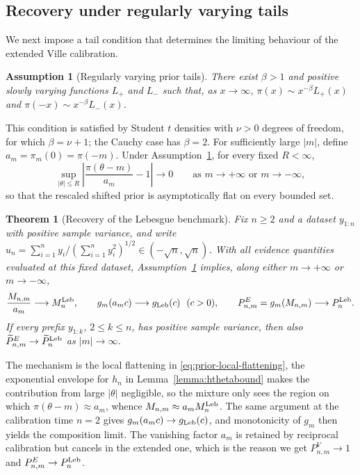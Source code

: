 \documentclass{article}
\newtheorem{theorem}{Theorem}
\newtheorem{assumption}{Assumption}
\begin{document}
\subsection{Recovery under regularly varying tails}
\label{subsec:recovery}

We next impose a tail condition that determines the limiting behaviour of
the extended Ville calibration.

\begin{assumption}[Regularly varying prior tails]
\label{ass:tails}
There exist $\beta>1$ and positive slowly varying functions $L_+$ and
$L_-$ such that, as $x\to\infty$, $\pi(x)\sim x^{-\beta}L_+(x)$ and
$\pi(-x)\sim x^{-\beta}L_-(x)$.
\end{assumption}

This condition is satisfied by Student $t$ densities with $\nu>0$ degrees
of freedom, for which $\beta=\nu+1$; the Cauchy case has $\beta=2$. For
sufficiently large $|m|$, define $a_m=\pi_m(0)=\pi(-m)$. Under
Assumption~\ref{ass:tails}, for every fixed $R<\infty$,
\begin{equation}
\label{eq:prior-local-flattening}
  \sup_{|\theta|\leq R}
  \left|\frac{\pi(\theta-m)}{a_m}-1\right|\longrightarrow0
  \qquad\text{as }m\to+\infty\text{ or }m\to-\infty,
\end{equation}
so that the rescaled shifted prior is asymptotically flat on every
bounded set.

\begin{theorem}[Recovery of the Lebesgue benchmark]
\label{thm:recovery}
Fix $n\geq2$ and a dataset $y_{1:n}$ with positive sample variance, and
write
$u_n=\sum_{i=1}^ny_i/(\sum_{i=1}^ny_i^2)^{1/2}\in(-\sqrt n,\sqrt n)$.
With all evidence quantities evaluated at this fixed dataset,
Assumption~\ref{ass:tails} implies, along either $m\to+\infty$ or
$m\to-\infty$,
\begin{equation}
\label{eq:recovery-limits}
  \frac{M_{n,m}}{a_m}\longrightarrow M_n^{\mathrm{Leb}},
  \qquad
  g_m(a_mc)\longrightarrow g_{\mathrm{Leb}}(c)\ \ (c>0),
  \qquad
  P_{n,m}^E=g_m(M_{n,m})\longrightarrow P_n^{\mathrm{Leb}} .
\end{equation}
If every prefix $y_{1:k}$, $2\leq k\leq n$, has positive sample variance,
then also $\widetilde P_{n,m}^E\to\widetilde P_n^{\mathrm{Leb}}$ as
$|m|\to\infty$.
\end{theorem}

The mechanism is the local flattening in
\eqref{eq:prior-local-flattening}, the exponential envelope for $h_n$ in Lemma~\ref{lemma:hthetabound} makes the contribution from large $|\theta|$ negligible, so the mixture only sees the region on which
$\pi(\theta-m)\approx a_m$, whence $M_{n,m}\approx a_mM_n^{\mathrm{Leb}}$. The same argument at the calibration time $n=2$ gives $g_m(a_mc)\to g_{\mathrm{Leb}}(c)$, and monotonicity of $g_m$ then yields the composition limit. The vanishing factor $a_m$ is retained by reciprocal calibration but cancels in the extended one, which is the reason we get $P_{n,m}^V\to1$ and $P_{n,m}^E\to P_n^{\mathrm{Leb}}$.
\end{document}
